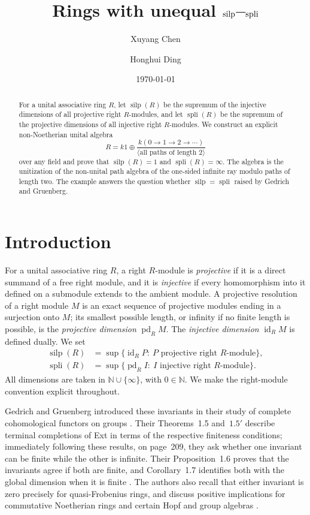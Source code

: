 \documentclass[11pt]{amsart}
\title[Rings with unequal silp--spli]{Rings with unequal \texorpdfstring{$\silp$--$\spli$}{silp--spli}}
\author{Xuyang Chen}
\author{Honghui Ding}
\date{\today}%
\theoremstyle{definition}
\theoremstyle{remark}
\newcommand{\silp}{\operatorname{silp}}
\newcommand{\spli}{\operatorname{spli}}
\newcommand{\pd}{\operatorname{pd}}
\newcommand{\idim}{\operatorname{id}}
\begin{document}
\begin{abstract}
For a unital associative ring $R$, let $\silp(R)$ be the supremum of the injective dimensions of all projective right $R$-modules, and let $\spli(R)$ be the supremum of the projective dimensions of all injective right $R$-modules. We construct an explicit non-Noetherian unital algebra \[R=k1\oplus
\frac{k(0\longrightarrow1\longrightarrow2\longrightarrow\cdots)}
{\langle\text{all paths of length }2\rangle}\] over any field and prove that
\(
\silp(R)=1\) and \(\spli(R)=\infty.
\)
The algebra is the unitization of the non-unital path algebra of the one-sided infinite ray modulo paths of length two. The example answers the question whether $\silp=\spli$ raised by Gedrich and Gruenberg.
\end{abstract}
\maketitle

\section{Introduction}
For a unital associative ring $R$, a right $R$-module is \emph{projective} if it is a direct summand of a free right module, and it is \emph{injective} if every homomorphism into it defined on a submodule extends to the ambient module. A projective resolution of a right module $M$ is an exact sequence of projective modules ending in a surjection onto $M$; its smallest possible length, or infinity if no finite length is possible, is the \emph{projective dimension} $\pd_R M$. The \emph{injective dimension} $\idim_R M$ is defined dually. We set
\begin{equation}\label{eq:invariants}
\begin{split}
\silp(R)&=\sup\{\idim_R P:\ P\text{ projective right }R\text{-module}\},\\
\spli(R)&=\sup\{\pd_R I:\ I\text{ injective right }R\text{-module}\}.
\end{split}
\end{equation}
All dimensions are taken in $\mathbb{N}\cup\{\infty\}$, with $0\in\mathbb{N}$. We make the right-module convention explicit throughout. 

Gedrich and Gruenberg introduced these invariants in their study of complete cohomological functors on groups \cite{GG1987}. Their Theorems~1.5 and~$1.5'$ describe terminal completions of Ext in terms of the respective finiteness conditions; immediately following these results, on page~209, they ask whether one invariant can be finite while the other is infinite. Their Proposition~1.6 proves that the invariants agree if both are finite, and Corollary~1.7 identifies both with the global dimension when it is finite \cite[pp.~209--210]{GG1987}. The authors also recall that either invariant is zero precisely for quasi-Frobenius rings, and discuss positive implications for commutative Noetherian rings and certain Hopf and group algebras \cite[pp.~203--204, \S2]{GG1987}.
\end{document}
